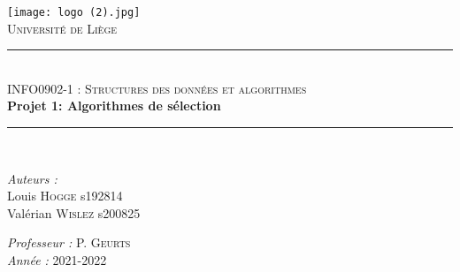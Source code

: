 \documentclass[a4paper, 11pt]{article}
\newcommand{\HRule}{\rule{\linewidth}{0.5mm}}
\begin{document}
\begin{titlepage}

\begin{center}
\texttt{[image: logo (2).jpg]}\\
\vspace{1cm}
\textsc{\huge Université de Liège}\\[1.2cm]
\HRule \\[1cm]
\textsc{\LARGE INFO0902-1 : Structures des données et algorithmes }\\[1cm]
{\Huge \bfseries Projet 1: Algorithmes de sélection}\\[1.4cm] 
\HRule \\[1cm]
\end{center}

\begin{minipage}{0.45\linewidth}
      \begin{flushleft} \large
        \emph{Auteurs : } \\
        Louis \textsc{Hogge}  s192814\\
        Valérian \textsc{Wislez}  s200825 
      \end{flushleft}
\end{minipage}
\hfill
\begin{minipage}{0.45\linewidth}
      \begin{flushright} \large
        \emph{Professeur : } P. \textsc{Geurts}\\
        \emph{Année : } 2021-2022 
      \end{flushright}
\end{minipage}

\end{titlepage}

\newpage
\end{document}
